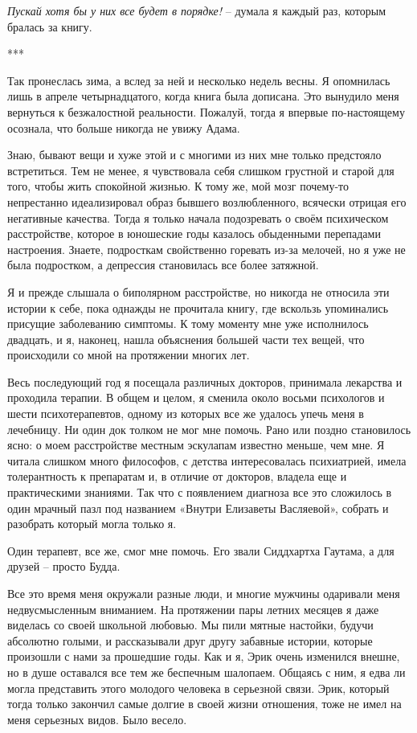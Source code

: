 \documentclass[
]{book}
\begin{document}
\emph{Пускай хотя бы у них все будет в порядке!} -- думала я каждый раз, которым бралась за книгу.

***

Так пронеслась зима, а вслед за ней и несколько недель весны. Я опомнилась лишь в апреле четырнадцатого, когда книга была дописана. Это вынудило меня вернуться к безжалостной реальности. Пожалуй, тогда я впервые по-настоящему осознала, что больше никогда не увижу Адама.

Знаю, бывают вещи и хуже этой и с многими из них мне только предстояло встретиться. Тем не менее, я чувствовала себя слишком грустной и старой для того, чтобы жить спокойной жизнью. К тому же, мой мозг почему-то непрестанно идеализировал образ бывшего возлюбленного, всячески отрицая его негативные качества. Тогда я только начала подозревать о своём психическом расстройстве, которое в юношеские годы казалось обыденными перепадами настроения. Знаете, подросткам свойственно горевать из-за мелочей, но я уже не была подростком, а депрессия становилась все более затяжной.

Я и прежде слышала о биполярном расстройстве, но никогда не относила эти истории к себе, пока однажды не прочитала книгу, где вскользь упоминались присущие заболеванию симптомы. К тому моменту мне уже исполнилось двадцать, и я, наконец, нашла объяснения большей части тех вещей, что происходили со мной на протяжении многих лет.

Весь последующий год я посещала различных докторов, принимала лекарства и проходила терапии. В общем и целом, я сменила около восьми психологов и шести психотерапевтов, одному из которых все же удалось упечь меня в лечебницу. Ни один док толком не мог мне помочь. Рано или поздно становилось ясно: о моем расстройстве местным эскулапам известно меньше, чем мне. Я читала слишком много философов, с детства интересовалась психиатрией, имела толерантность к препаратам и, в отличие от докторов, владела еще и практическими знаниями. Так что с появлением диагноза все это сложилось в один мрачный пазл под названием «Внутри Елизаветы Васляевой», собрать и разобрать который могла только я.

Один терапевт, все же, смог мне помочь. Его звали Сиддхартха Гаутама, а для друзей -- просто Будда.

Все это время меня окружали разные люди, и многие мужчины одаривали меня недвусмысленным вниманием. На протяжении пары летних месяцев я даже виделась со своей школьной любовью. Мы пили мятные настойки, будучи абсолютно голыми, и рассказывали друг другу забавные истории, которые произошли с нами за прошедшие годы. Как и я, Эрик очень изменился внешне, но в душе оставался все тем же беспечным шалопаем. Общаясь с ним, я едва ли могла представить этого молодого человека в серьезной связи. Эрик, который тогда только закончил самые долгие в своей жизни отношения, тоже не имел на меня серьезных видов. Было весело.
\end{document}

